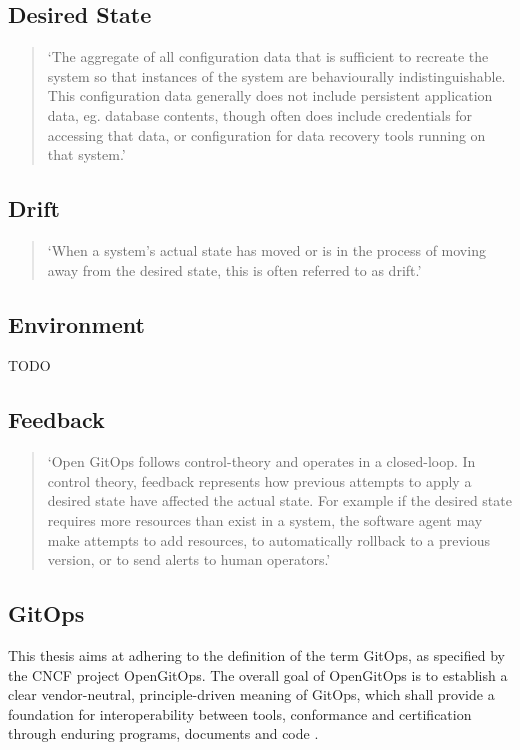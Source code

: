\subsection*{Desired State}
\begin{quotation}
\noindent
\enquote*{The aggregate of all configuration data that is sufficient to recreate the system so that instances of the system are behaviourally indistinguishable. This configuration data generally does not include persistent application data, eg. database contents, though often does include credentials for accessing that data, or configuration for data recovery tools running on that system.}
\autocite{gitopsGlossary}
\end{quotation}

\subsection*{Drift}
\begin{quotation}
\noindent
\enquote*{When a system's actual state has moved or is in the process of moving away from the desired state, this is often referred to as drift.}
\autocite{gitopsGlossary}
\end{quotation}

\subsection*{Environment}
TODO

\subsection*{Feedback}
\begin{quotation}
	\noindent
	\enquote*{Open GitOps follows control-theory and operates in a closed-loop. In control theory, feedback represents how previous attempts to apply a desired state have affected the actual state. For example if the desired state requires more resources than exist in a system, the software agent may make attempts to add resources, to automatically rollback to a previous version, or to send alerts to human operators.}
	\autocite{gitopsGlossary}
\end{quotation}

\subsection*{GitOps}

This thesis aims at adhering to the definition of the term GitOps,
as specified by the CNCF project OpenGitOps.
The overall goal of OpenGitOps is to establish a clear vendor-neutral,
principle-driven meaning of GitOps,
which shall provide a foundation for interoperability between tools, conformance and certification through enduring programs, documents and code
\autocite{opengitopsDocuments}.

